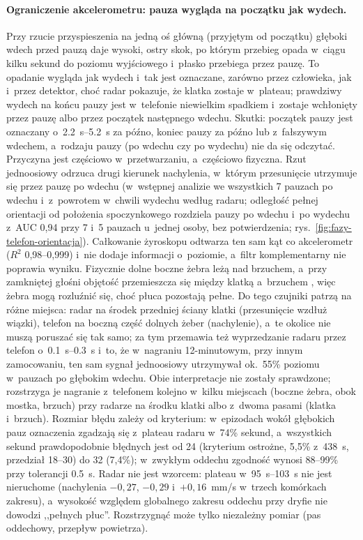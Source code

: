 \documentclass[12pt,a4paper,oneside]{report}
\begin{document}
\paragraph{Ograniczenie akcelerometru: pauza wygląda na początku jak wydech.} Przy rzucie przyspieszenia
na jedną oś główną (przyjętym od początku) głęboki wdech przed pauzą daje wysoki, ostry skok, po którym
przebieg opada w~ciągu kilku sekund do poziomu wyjściowego i~płasko przebiega przez pauzę. To opadanie
wygląda jak wydech i~tak jest oznaczane, zarówno przez człowieka, jak i~przez detektor, choć radar pokazuje,
że klatka zostaje w~plateau; prawdziwy wydech na końcu pauzy jest w~telefonie niewielkim spadkiem
i~zostaje wchłonięty przez pauzę albo przez początek następnego wdechu. Skutki: początek pauzy
jest oznaczany o~\SIrange{2.2}{5.2}{s} za późno, koniec pauzy za późno lub z~fałszywym wdechem,
a~rodzaju pauzy (po wdechu czy po wydechu) nie da się odczytać. Przyczyna jest
częściowo w~przetwarzaniu, a~częściowo fizyczna. Rzut jednoosiowy odrzuca drugi kierunek nachylenia,
w~którym przesunięcie utrzymuje się przez pauzę po wdechu (w~wstępnej analizie we wszystkich 7 pauzach
po wdechu i~z~powrotem w~chwili wydechu według radaru; odległość pełnej orientacji od położenia
spoczynkowego rozdziela pauzy po wdechu i~po wydechu z~AUC 0,94 przy 7 i~5 pauzach u~jednej osoby,
bez potwierdzenia; rys.~\ref{fig:fazy-telefon-orientacja}). Całkowanie żyroskopu odtwarza ten sam kąt co akcelerometr ($R^2$ 0,98--0,999)
i~nie dodaje informacji o~poziomie, a~filtr komplementarny nie poprawia wyniku. Fizycznie dolne boczne
żebra leżą nad brzuchem, a~przy zamkniętej głośni objętość przemieszcza się między klatką
a~brzuchem \cite{konno1967}, więc żebra mogą rozluźnić się, choć płuca pozostają pełne. Do tego
czujniki patrzą na różne miejsca: radar na środek przedniej ściany klatki (przesunięcie wzdłuż wiązki),
telefon na boczną część dolnych żeber (nachylenie), a~te okolice nie muszą poruszać się tak samo; za
tym przemawia też wyprzedzanie radaru przez telefon o~\SIrange{0.1}{0.3}{s} i~to, że w~nagraniu
12-minutowym, przy innym zamocowaniu, ten sam sygnał jednoosiowy utrzymywał ok.~55\% poziomu
w~pauzach po głębokim wdechu. Obie interpretacje nie zostały sprawdzone; rozstrzyga je nagranie
z~telefonem kolejno w~kilku miejscach (boczne żebra, obok mostka, brzuch) przy radarze na środku klatki
albo z~dwoma pasami (klatka i~brzuch). Rozmiar błędu zależy od kryterium: w~epizodach wokół głębokich pauz
oznaczenia zgadzają się z~plateau radaru w~74\% sekund, a~wszystkich sekund prawdopodobnie błędnych
jest od 24 (kryterium ostrożne, 5,5\% z~438~s, przedział 18--30) do 32 (7,4\%); w~zwykłym oddechu zgodność
wynosi 88--99\% przy tolerancji \SI{0.5}{s}. Radar nie jest wzorcem: plateau w~\SIrange{95}{103}{s} nie
jest nieruchome (nachylenia $-0{,}27$, $-0{,}29$ i~$+0{,}16$~mm/s w~trzech komórkach zakresu), a~wysokość
względem globalnego zakresu oddechu przy dryfie nie dowodzi ,,pełnych płuc''. Rozstrzygnąć może tylko
niezależny pomiar (pas oddechowy, przepływ powietrza).
\end{document}
